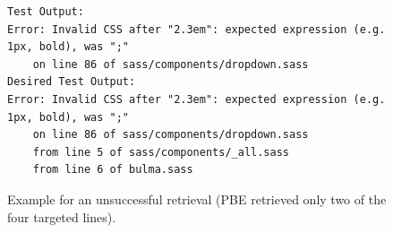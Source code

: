 \begin{figure}[!t]
  \centering
  \begin{lstlisting}[breaklines=true]
Test Output:
Error: Invalid CSS after "2.3em": expected expression (e.g.
1px, bold), was ";"
	on line 86 of sass/components/dropdown.sass
Desired Test Output:
Error: Invalid CSS after "2.3em": expected expression (e.g.
1px, bold), was ";"
	on line 86 of sass/components/dropdown.sass
	from line 5 of sass/components/_all.sass
	from line 6 of bulma.sass
  \end{lstlisting}
  \caption{Example for an unsuccessful retrieval (PBE retrieved only
  two of the four targeted lines).}
  \label{lst:pbe-unsuccessful}
\end{figure}

